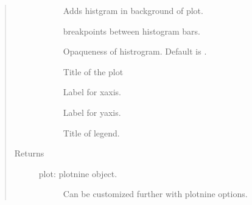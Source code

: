 \documentclass[letterpaper,10pt,english]{sphinxmanual}
\begin{document}
\begin{fulllineitems}
\begin{quote}
\begin{description}
\begin{description}
\item[{}] \leavevmode
\sphinxAtStartPar
Adds histgram in background of plot.

\item[{}] \leavevmode
\sphinxAtStartPar
breakpoints between histogram bars.

\item[{}] \leavevmode
\sphinxAtStartPar
Opaqueness of histrogram. Default is .

\item[{}] \leavevmode
\sphinxAtStartPar
Title of the plot

\item[{}] \leavevmode
\sphinxAtStartPar
Label for x\sphinxhyphen{}axis.

\item[{}] \leavevmode
\sphinxAtStartPar
Label for y\sphinxhyphen{}axis.

\item[{}] \leavevmode
\sphinxAtStartPar
Title of legend.

\end{description}

\item[{Returns}] \leavevmode\begin{description}
\item[{plot: plotnine object.}] \leavevmode
\sphinxAtStartPar
Can be customized further with plotnine options.

\end{description}

\end{description}\end{quote}


\nopagebreak

\begin{description}
\item[{{\hyperref[\detokenize{rddensity:module-rddensity.rddensity}]{}}}] \leavevmode
\item[{{\hyperref[\detokenize{rdbwdensity:module-rddensity.rdbwdensity}]{}}}] \leavevmode
\end{description}



\end{fulllineitems}
\end{document}

